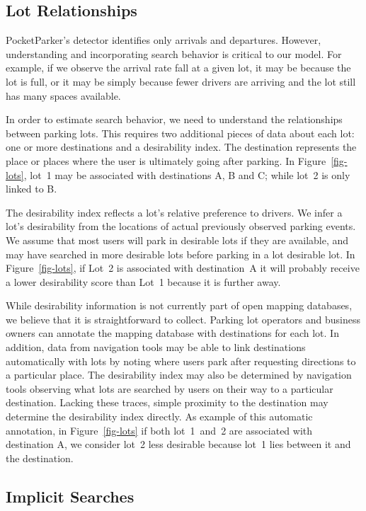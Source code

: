 \subsection{Lot Relationships}
\label{subsec-lots}
PocketParker's detector identifies only arrivals and departures. However,
understanding and incorporating search behavior is critical to our model. For
example, if we observe the arrival rate fall at a given lot, it may be
because the lot is full, or it may be simply because fewer drivers are
arriving and the lot still has many spaces available.

In order to estimate search behavior, we need to understand the relationships
between parking lots. This requires two additional pieces of data about each
lot: one or more destinations and a desirability index. The destination
represents the place or places where the user is ultimately going after
parking.  In Figure~\ref{fig-lots}, lot~1 may be associated with destinations
A, B and C; while lot~2 is only linked to B.

The desirability index reflects a lot's relative preference to drivers.
We infer a lot's desirability from the locations of actual previously observed
parking events.  We assume that most users will park in desirable lots if they
are available, and may have searched in more desirable lots before parking in
a lot desirable lot. In Figure~\ref{fig-lots}, if Lot~2 is associated with
destination~A it will probably receive a lower desirability score than Lot~1
because it is further away.


While desirability information is not currently part of open mapping databases,
we believe that it is straightforward to collect. Parking lot operators and
business owners can annotate the mapping database with destinations for each
lot. In addition, data from navigation tools may be able to link destinations
automatically with lots by noting where users park after requesting directions
to a particular place. The desirability index may also be determined by
navigation tools observing what lots are searched by users on their way to a
particular destination. Lacking these traces, simple proximity to the
destination may determine the desirability index directly. As example of this
automatic annotation, in Figure~\ref{fig-lots} if both lot~1~and~2 are
associated with destination A, we consider lot~2 less desirable because lot~1
lies between it and the destination.

\subsection{Implicit Searches}
\label{subsec-implicit}

